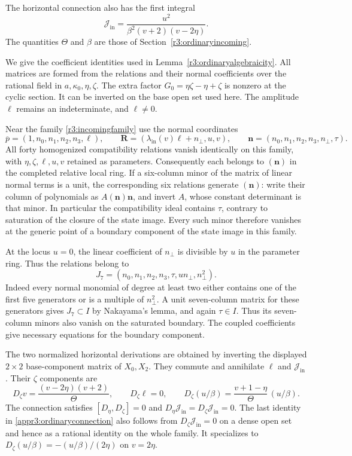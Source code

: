 \documentclass[11pt,a4paper]{article}
\numberwithin{equation}{section}
\theoremstyle{plain}
\theoremstyle{definition}
\theoremstyle{remark}
\begin{document}
The horizontal connection also has the first integral
\[
 \mathcal J_{\mathrm{in}}
 =\frac{u^2}{\beta^2(v+2)(v-2\eta)}.
\]
The quantities $\Theta$ and $\beta$ are those of
Section~\ref{r3:ordinaryincoming}.

We give the coefficient identities used in
Lemma~\ref{r3:ordinaryalgebraicity}. All matrices are formed from the
relations and their normal coefficients over the rational field
in $a,\kappa_0 ,\eta ,\zeta $. The extra factor $G_0=\eta \zeta -\eta +\zeta $ is nonzero at the cyclic
section. It can be inverted on the base open set used here. The
amplitude $\ell$ remains an indeterminate, and $\ell\ne0$.

Near the family \eqref{r3:incomingfamily} use the normal coordinates
\begin{equation}\label{appr3:ordinarynormals}
 \overline p=(1,n_0,n_1,n_2,n_3,\ell),\qquad
 \boldsymbol R=(\lambda_{\mathrm{in}}(v)\ell+n_\perp,u,v),\qquad
 \boldsymbol n=(n_0,n_1,n_2,n_3,n_\perp,\tau).
\end{equation}
All forty homogenized compatibility relations vanish identically
on this family, with $\eta ,\zeta ,\ell,u,v$ retained as parameters. Consequently
each belongs to $(\boldsymbol n)$ in the completed relative local ring.
If a six-column minor of the matrix of linear normal terms is a unit,
the corresponding six
relations generate $(\boldsymbol n)$: write their column of
polynomials as $A(\boldsymbol n)\boldsymbol n$, and invert $A$, whose
constant determinant is that minor. In particular the compatibility ideal
contains $\tau$, contrary to saturation of the closure of the state image.
Every such minor therefore vanishes at the generic point of a
boundary component of the state image in this family.

At the locus $u=0$, the linear coefficient of $n_\perp$ is divisible by $u$
in the parameter ring. Thus the relations belong to
\[
 J_7=(n_0,n_1,n_2,n_3,\tau,un_\perp,n_\perp^2).
\]
Indeed every normal monomial of degree at least two either contains
one of the first five generators or is a multiple of $n_\perp^2$.
A unit seven-column matrix for these generators gives $J_7\subset I$
by Nakayama's lemma, and again $\tau\in I$. Thus its seven-column
minors also vanish on the saturated boundary. The coupled coefficients give necessary equations for the
boundary component.

The two normalized horizontal derivations are obtained by inverting
the displayed $2\times2$ base-component matrix of $X_0,X_2$. They commute and annihilate
$\ell$ and $\mathcal J_{\mathrm{in}}$. Their $\zeta $ components are
\begin{equation}\label{appr3:ordinaryconnection}
 D_\zeta v=\frac{(v-2\eta )(v+2)}{\Theta},\qquad D_\zeta \ell=0,\qquad
 D_\zeta (u/\beta)=\frac{v+1-\eta }{\Theta}\,(u/\beta).
\end{equation}
The connection satisfies $[D_\eta,D_\zeta]=0$ and
$D_\eta \mathcal J_{\mathrm{in}}=D_\zeta \mathcal J_{\mathrm{in}}=0$. The last identity in
\eqref{appr3:ordinaryconnection} also follows from $D_\zeta \mathcal J_{\mathrm{in}}=0$ on a
dense open set and hence as a rational identity on the whole family.
It specializes to $D_\zeta (u/\beta)=-(u/\beta)/(2\eta )$ on $v=2\eta $.
\end{document}
